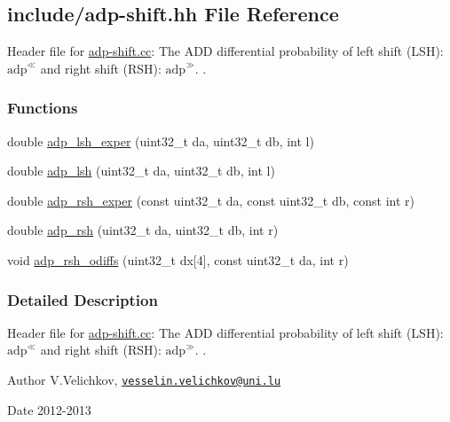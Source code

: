 \hypertarget{adp-shift_8hh}{\subsection{include/adp-\/shift.hh \-File \-Reference}
\label{adp-shift_8hh}
}


\-Header file for \hyperlink{adp-shift_8cc}{adp-\/shift.\-cc}\-: \-The \-A\-D\-D differential probability of left shift (\-L\-S\-H)\-: $\mathrm{adp}^{\ll}$ and right shift (\-R\-S\-H)\-: $\mathrm{adp}^{\gg}$. .  


\subsubsection*{\-Functions}
\begin{DoxyCompactItemize}
\item 
double \hyperlink{adp-shift_8hh_a862d37a2421ed62045358ce6e9bb9dcb}{adp\-\_\-lsh\-\_\-exper} (uint32\-\_\-t da, uint32\-\_\-t db, int l)
\item 
double \hyperlink{adp-shift_8hh_a48f94900b0d370c44ef16256310d073f}{adp\-\_\-lsh} (uint32\-\_\-t da, uint32\-\_\-t db, int l)
\item 
double \hyperlink{adp-shift_8hh_a6a874c5f39e73547bf93fb1356e6e580}{adp\-\_\-rsh\-\_\-exper} (const uint32\-\_\-t da, const uint32\-\_\-t db, const int r)
\item 
double \hyperlink{adp-shift_8hh_a06fffd781af6662482922889bc562caf}{adp\-\_\-rsh} (uint32\-\_\-t da, uint32\-\_\-t db, int r)
\item 
void \hyperlink{adp-shift_8hh_aa68814fb7eac34b923f42cfa1445a6b1}{adp\-\_\-rsh\-\_\-odiffs} (uint32\-\_\-t dx\mbox{[}4\mbox{]}, const uint32\-\_\-t da, int r)
\end{DoxyCompactItemize}


\subsubsection{\-Detailed \-Description}
\-Header file for \hyperlink{adp-shift_8cc}{adp-\/shift.\-cc}\-: \-The \-A\-D\-D differential probability of left shift (\-L\-S\-H)\-: $\mathrm{adp}^{\ll}$ and right shift (\-R\-S\-H)\-: $\mathrm{adp}^{\gg}$. . \begin{DoxyAuthor}{\-Author}
\-V.\-Velichkov, \href{mailto:vesselin.velichkov@uni.lu}{\tt vesselin.\-velichkov@uni.\-lu} 
\end{DoxyAuthor}
\begin{DoxyDate}{\-Date}
2012-\/2013 
\end{DoxyDate}


